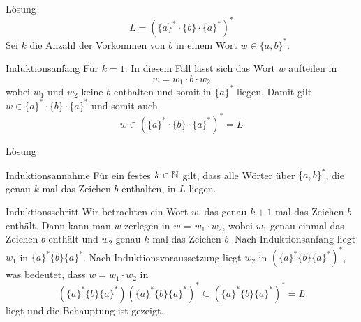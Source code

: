 \begin{frame}{Lösung}
	$$L = (\{a\}^\ast \cdot \{b\} \cdot \{a\}^\ast)^\ast$$
	Sei $k$ die Anzahl der Vorkommen von $b$ in einem Wort $w \in \{a, b\}^\ast$.
	\begin{block}{Induktionsanfang}  \pause
		Für $k = 1$: In diesem Fall lässt sich das Wort $w$ aufteilen in $$w = w_1 \cdot b \cdot w_2$$ wobei $w_1$ und $w_2$ keine $b$ enthalten und somit in $\{a\}^\ast$ liegen. Damit gilt $w \in \{a\}^\ast \cdot \{b\} \cdot \{a\}^\ast$ und somit auch $$w \in (\{a\}^\ast \cdot \{b\} \cdot \{a\}^\ast)^\ast = L$$
	\end{block}
\end{frame}

\begin{frame}{Lösung}
	\begin{block}{Induktionsannahme}  \pause
		Für ein festes $k \in \mathbb{N}$ gilt, dass alle Wörter über $\{a, b\}^\ast$, die genau $k$-mal das Zeichen $b$ enthalten, in $L$ liegen.
	\end{block} \pause
	\begin{block}{Induktionsschritt}  \pause
		Wir betrachten ein Wort $w$, das genau $k + 1$ mal das Zeichen $b$ enthält. Dann kann man $w$ zerlegen in $w$ = $w_1 \cdot w_2$, wobei $w_1$ genau einmal das Zeichen $b$ enthält und $w_2$ genau $k$-mal das Zeichen $b$. \pause Nach Induktionsanfang liegt $w_1$ in $\{a\}^\ast \{b\}\{a\}^\ast$. Nach Induktionsvoraussetzung liegt $w_2$ in $(\{a\}^\ast \{b\}\{a\}^\ast )^\ast$, was bedeutet, dass $w = w_1 \cdot w_2$ in $$(\{a\}^\ast \{b\}\{a\}^\ast )(\{a\}^\ast \{b\}\{a\}^\ast )^\ast \subseteq (\{a\}^\ast \{b\}\{a\}^\ast )^\ast = L$$ liegt und die Behauptung ist gezeigt.
	\end{block}
\end{frame}

